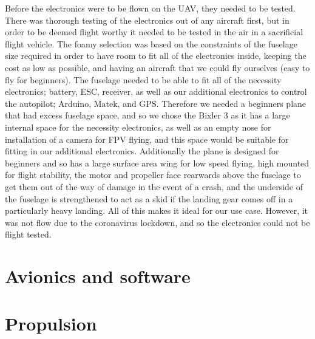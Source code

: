 \documentclass[../../main.tex]{subfiles}
\begin{document}
Before the electronics were to be flown on the UAV, they needed to be tested.
There was thorough testing of the electronics out of any aircraft first, but in order to be deemed flight worthy it needed to be tested in the air in a sacrificial flight vehicle.
The foamy selection was based on the constraints of the fuselage size required in order to have room to fit all of the electronics inside, keeping the cost as low as possible, and having an aircraft that we could fly ourselves (easy to fly for beginners).
The fuselage needed to be able to fit all of the necessity electronics; battery, ESC, receiver, as well as our additional electronics to control the autopilot; Arduino, Matek, and GPS.
Therefore we needed a beginners plane that had excess fuselage space, and so we chose the Bixler 3 as it has a large internal space for the necessity electronics, as well as an empty nose for installation of a camera for FPV flying, and this space would be suitable for fitting in our additional electronics.
Additionally the plane is designed for beginners and so has a large surface area wing for low speed flying, high mounted for flight stability, the motor and propeller face rearwards above the fuselage to get them out of the way of damage in the event of a crash, and the underside of the fuselage is strengthened to act as a skid if the landing gear comes off in a particularly heavy landing.
All of this makes it ideal for our use case.
However, it was not flow due to the coronavirus lockdown, and so the electronics could not be flight tested. 

\section{Avionics and software} \label{sec:final-design-proposal:avionics-and-software}


\section{Propulsion} \label{sec:final-design-proposal:propulsion}
\end{document}
